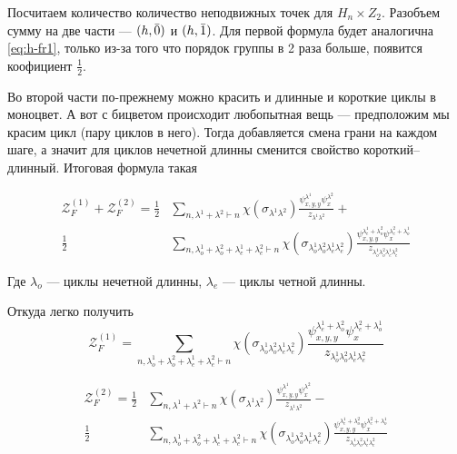 Посчитаем количество количество неподвижных точек для $H_n \times Z_2$. Разобъем
сумму на две части --- $(h, \Bar 0)$ и $(h, \Bar 1)$. Для первой формула будет
аналогична \ref{eq:h-fr1}, только из-за того что порядок группы в 2 раза больше,
появится коофициент $\frac{1}{2}$.

Во второй части по-прежнему можно красить и длинные и короткие циклы в моноцвет.
А вот с бицветом происходит любопытная вещь --- предположим мы красим цикл (пару
циклов в него). Тогда добавляется смена грани на каждом шаге, а значит для
циклов нечетной длинны сменится свойство короткий--длинный. Итоговая формула
такая 

\begin{equation}
\label{eq:h-fr2}
\begin{split}
\mathcal Z_F^{(1)} + \mathcal Z_F^{(2)} = 
\frac{1}{2}&
\sum_{n, \lambda^1 + \lambda^2 \vdash n}\chi(\sigma_{\lambda^1 \lambda^2})
\frac{\psi_{x, y, y}^{\lambda^1} \psi_{x}^{\lambda^2}}{z_{\lambda^1 \lambda^2}}
+ \\
\frac{1}{2}&
\sum_{n, \lambda_o^1 + \lambda_o^2 + \lambda_e^1 + \lambda_e^2 \vdash
n}\chi(\sigma_{\lambda_o^1 \lambda_o^2 \lambda_e^1 \lambda_e^2})
\frac{\psi_{x, y, y}^{\lambda_e^1 + \lambda_o^2} \psi_{x}^{\lambda_e^2 + 
\lambda_o^1}}{z_{\lambda_o^1 \lambda_o^2 \lambda_e^1 \lambda_e^2}}
\end{split}
\end{equation}

Где $\lambda_o$ --- циклы нечетной длинны, $\lambda_e$ ---
циклы четной длинны.

Откуда легко получить
\begin{equation}
\mathcal Z_F^{(1)} = 
\sum_{n, \lambda_o^1 + \lambda_o^2 + \lambda_e^1 + \lambda_e^2 \vdash
n}\chi(\sigma_{\lambda_o^1 \lambda_o^2 \lambda_e^1 \lambda_e^2})
\frac{\psi_{x, y, y}^{\lambda_e^1 + \lambda_o^2} \psi_{x}^{\lambda_e^2 + 
\lambda_o^1}}{z_{\lambda_o^1 \lambda_o^2 \lambda_e^1 \lambda_e^2}}
\end{equation}

\begin{equation}
\begin{split}
\mathcal Z_F^{(2)} = 
\frac{1}{2}&
\sum_{n, \lambda^1 + \lambda^2 \vdash n}\chi(\sigma_{\lambda^1 \lambda^2})
\frac{\psi_{x, y, y}^{\lambda^1} \psi_{x}^{\lambda^2}}{z_{\lambda^1 \lambda^2}}
- \\
\frac{1}{2}&
\sum_{n, \lambda_o^1 + \lambda_o^2 + \lambda_e^1 + \lambda_e^2 \vdash
n}\chi(\sigma_{\lambda_o^1 \lambda_o^2 \lambda_e^1 \lambda_e^2})
\frac{\psi_{x, y, y}^{\lambda_e^1 + \lambda_o^2} \psi_{x}^{\lambda_e^2 + 
\lambda_o^1}}{z_{\lambda_o^1 \lambda_o^2 \lambda_e^1 \lambda_e^2}}
\end{split}
\end{equation}

